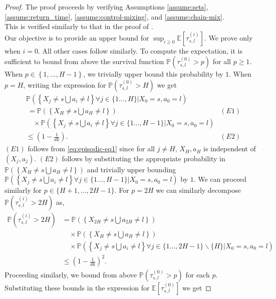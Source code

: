\documentclass[opre,sglanonrev]{informs4}
\numberwithin{equation}{section}
\newcommand{\pow}[1]{^{(#1)}}
\newcommand{\lp}{\left(}
\newcommand{\rp}{\right)}
\newcommand{\lc}{\left\{}
\newcommand{\rc}{\right\}}
\newcommand{\Pbb}{\mathbb{P}}
\newcommand{\prob}{\Pbb}
\newcommand{\expec}{\mathbb{E}}
\begin{document}
\begin{APPENDICES}
\begin{proof}
The proof proceeds by verifying Assumptions \ref{assume:sets}, \ref{assume:return_time},  \ref{assume:control-mixing}, and \ref{assume:chain-mix}.\\
 This is verified similarly to that in the proof of .\\
 Our objective is to provide an upper bound for $\sup_{i\geq 0}\expec[\tau_{s,l}\pow{i}]$.
We prove only when $i=0$. All other cases follow similarly. 
To compute the expectation, it is sufficient to bound from above the survival function $\prob\lp\tau_{s,l}\pow{0}>p\rp$ for all $p\geq 1$.
When $p\in\lc 1,\dots,H -1 \rc$, we trivially upper bound this probability by $1$.
When $p=H $, writing the expression for $\prob\lp\tau_{s,l}\pow{0}>H \rp $ we get
\begin{align*}
    & \prob\lp \lc X_j\neq s\bigcup a_i\neq l \rc \forall j\in\{1\dots,H \}|X_0=s,a_0=l \rp\\
    &\  = \prob\lp \lc X_H \neq s\bigcup a_H \neq l \rc  \rp & (E1)\\
    & \quad \times \prob\lp \lc X_j\neq s\bigcup a_i\neq l \rc \forall j\in\{1\dots,H -1\}|X_0=s,a_0=l \rp\\
    & \leq \lp1-\frac{1}{dk}\rp.& (E2)
\end{align*}
$(E1)$ follows from \cref{eq:episodic-eq1} since for all $j\neq H $, $X_H ,a_H $ is independent of $(X_j,a_j)$.
$(E2)$ follows by substituting the appropriate probability in  $\prob\lp \lc X_H \neq s\bigcup a_H \neq l \rc  \rp$ and trivially upper bounding $\prob\lp \lc X_j\neq s\bigcup a_i\neq l \rc \forall j\in\{1\dots,H -1\}|X_0=s,a_0=l \rp$ by $1$.
We can proceed similarly for $p\in\{H +1,\dots,2H -1\}$.
For $p=2H $ we can similarly decompose $\prob\lp\tau_{s,l}\pow{i}>2H \rp$ as,
\begin{align*}
    \prob\lp\tau_{s,l}\pow{i}>2H \rp & = \prob\lp \lc X_{2H }\neq s\bigcup a_{2H }\neq l \rc  \rp & \\
    & \quad \times \prob\lp \lc X_H \neq s\bigcup a_H \neq l \rc  \rp & \\
    & \quad \times \prob\lp \lc X_j\neq s\bigcup a_i\neq l \rc \forall j\in\{1\dots,2H -1\}\backslash\{H \}|X_0=s,a_0=l \rp\\
    &\leq \lp1-\frac{1}{dk}\rp^2.
\end{align*}
Proceeding similarly, we bound from above $ \prob\lp\tau_{s,l}\pow{0}>p\rp$ for each $p$.
Substituting these bounds in the expression for $\expec[\tau_{s,l}\pow{0}]$ we get

\end{proof}
\end{APPENDICES}
\end{document}
